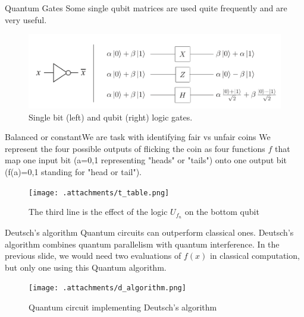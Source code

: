 \documentclass{beamer}
\begin{document}
\begin{frame}{Quantum Gates}
	\justifying 
	Some single qubit matrices are used quite frequently and are very useful.
	\center
	\begin{figure}
	\includegraphics[keepaspectratio=true,width=.8\paperwidth]{.attachments/single_qubit.png}
	\caption{Single bit (left) and qubit (right) logic gates.}
\end{figure}
\end{frame}

\begin{frame}{Balanced or constant}{We are task with identifying fair vs unfair coins}
	\justifying 
	We represent the four possible outputs of flicking the coin as four functions $f$ that map one input bit (a=0,1 representing "heads" or "tails") onto one output bit (f(a)=0,1 standing for "head or tail").
	\newline
	\newline
	\begin{figure}
		\texttt{[image: .attachments/t\_table.png]}
		\caption{The third line is the effect of the logic $U_{f_n}$ on the bottom qubit}
	\end{figure}

\end{frame}

\begin{frame}{Deutsch's algorithm}
	\justifying 
	Quantum circuits can outperform classical ones. Deutsch's algorithm combines quantum parallelism  with quantum interference. In the previous slide, we would need two evaluations of $f(x)$ in classical computation, but only one using this Quantum algorithm.
	\center
	\begin{figure}
	\texttt{[image: .attachments/d\_algorithm.png]}
	\caption{Quantum circuit implementing Deutsch's algorithm}
\end{figure}
\end{frame}
\end{document}

